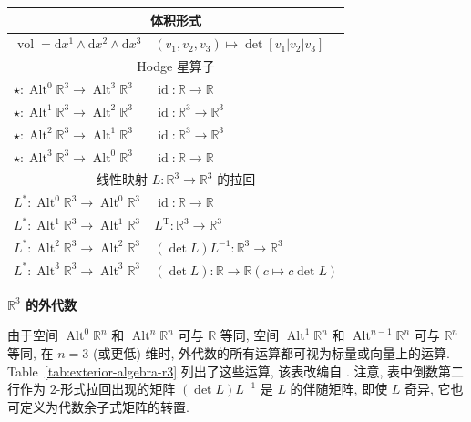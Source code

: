 \begin{table}[htbp]
\begin{tabular}{l|l}
\multicolumn{2}{c}{{体积形式}}\\\hline
$\operatorname{vol}=\mathrm{d}x^1\wedge \mathrm{d}x^2\wedge \mathrm{d}x^3$&$(v_1,v_2,v_3)\mapsto\det[v_1|v_2|v_3]$\\\hline
\multicolumn{2}{c}{Hodge {星算子}}\\\hline
$\star:\operatorname{Alt}^0\mathbb R^3\to\operatorname{Alt}^3\mathbb R^3$&$\operatorname{id}:\mathbb R\to\mathbb R$\\
$\star:\operatorname{Alt}^1\mathbb R^3\to\operatorname{Alt}^2\mathbb R^3$&$\operatorname{id}:\mathbb R^3\to\mathbb R^3$\\
$\star:\operatorname{Alt}^2\mathbb R^3\to\operatorname{Alt}^1\mathbb R^3$&$\operatorname{id}:\mathbb R^3\to\mathbb R^3$\\
$\star:\operatorname{Alt}^3\mathbb R^3\to\operatorname{Alt}^0\mathbb R^3$&$\operatorname{id}:\mathbb R\to\mathbb R$\\\hline
\multicolumn{2}{c}{{线性映射 $L:\mathbb R^3\to\mathbb R^3$ 的拉回}}\\\hline
$L^*:\operatorname{Alt}^0\mathbb R^3\to\operatorname{Alt}^0\mathbb R^3$&$\operatorname{id}:\mathbb R\to\mathbb R$\\
$L^*:\operatorname{Alt}^1\mathbb R^3\to\operatorname{Alt}^1\mathbb R^3$&$L^{\mathrm T}:\mathbb R^3\to\mathbb R^3$\\
$L^*:\operatorname{Alt}^2\mathbb R^3\to\operatorname{Alt}^2\mathbb R^3$&$(\det L)L^{-1}:\mathbb R^3\to\mathbb R^3$\\
$L^*:\operatorname{Alt}^3\mathbb R^3\to\operatorname{Alt}^3\mathbb R^3$&$(\det L):\mathbb R\to\mathbb R$\quad$(c\mapsto c\det L)$\\\hline
\end{tabular}
\end{table}

\medskip\noindent\textbf{{$\mathbb R^3$ 的外代数}}\par
由于空间 $\operatorname{Alt}^0\mathbb R^n$ 和 $\operatorname{Alt}^n\mathbb R^n$ 可与 $\mathbb R$ 等同, 空间 $\operatorname{Alt}^1\mathbb R^n$ 和 $\operatorname{Alt}^{n-1}\mathbb R^n$ 可与 $\mathbb R^n$ 等同, 在 $n=3$ (或更低) 维时, 外代数的所有运算都可视为标量或向量上的运算. Table~\ref{tab:exterior-algebra-r3} 列出了这些运算, 该表改编自 . 注意, 表中倒数第二行作为 $2$-形式拉回出现的矩阵 $(\det L)L^{-1}$ 是 $L$ 的伴随矩阵, 即使 $L$ 奇异, 它也可定义为代数余子式矩阵的转置.
